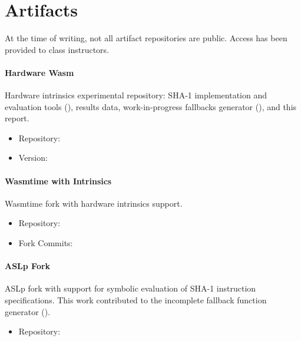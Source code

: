 \section{Artifacts}
\label{sec:artifacts}

At the time of writing, not all artifact repositories are public. Access has
been provided to class instructors.

\paragraph{Hardware Wasm}

Hardware intrinsics experimental repository:
SHA-1 implementation and evaluation tools (),
results data,
work-in-progress fallbacks generator (),
and this report.

\begin{itemize}
    \item Repository: 
    \item Version: \href{https://github.com/mmcloughlin/hwwasm/tree/\gitversion}{\code{\gitversion}}
\end{itemize}

\paragraph{Wasmtime with Intrinsics}

Wasmtime fork with hardware intrinsics support.

\begin{itemize}
    \item Repository: 
    \item Fork Commits: \href{https://github.com/mmcloughlin/hwwasmtime/compare/v27.0.0...hwwasm}{}
\end{itemize}

\paragraph{ASLp Fork}

ASLp fork with support for symbolic evaluation of SHA-1 instruction
specifications. This work contributed to the incomplete fallback function
generator ().

\begin{itemize}
    \item Repository: 
\end{itemize}
